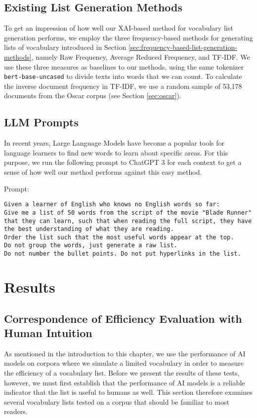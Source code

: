 \subsection{Existing List Generation Methods}
To get an impression of how well our XAI-based method for vocabulary list generation performs, we employ the three frequency-based methods for generating lists of vocabulary introduced in Section \ref{sec:frequency-based-list-generation-methods}, namely Raw Frequency, Average Reduced Frequency, and TF-IDF.
We use these three measures as baselines to our methods, using the same tokenizer \texttt{bert-base-uncased} to divide texts into words that we can count.
To calculate the inverse document frequency in TF-IDF, we use a random sample of 53,178 documents from the Oscar corpus (see Section \ref{sec:oscar}).


\subsection{LLM Prompts}
In recent years, Large Language Models have become a popular tools for language learners to find new words to learn about specific areas.
For this purpose, we run the following prompt to ChatGPT 3 for each context to get a sense of how well our method performs against this easy method.

Prompt:

\begin{lstlisting}[caption={Prompt given to the language model.}, label={lst:blade_runner_prompt}, captionpos=b]
	Given a learner of English who knows no English words so far:
Give me a list of 50 words from the script of the movie "Blade Runner" that they can learn, such that when reading the full script, they have the best understanding of what they are reading.
Order the list such that the most useful words appear at the top.
Do not group the words, just generate a raw list.
Do not number the bullet points. Do not put hyperlinks in the list.

\end{lstlisting}

\section{Results} \label{sec:results}

\subsection{Correspondence of Efficiency Evaluation with Human Intuition}
As mentioned in the introduction to this chapter, we use the performance of AI models on corpora where we simulate a limited vocabulary in order to measure the efficiency of a vocabulary list.
Before we present the results of these tests, however, we must first establish that the performance of AI models is a reliable indicator that the list is useful to humans as well.
This section therefore examines several vocabulary lists tested on a corpus that should be familiar to most readers.

